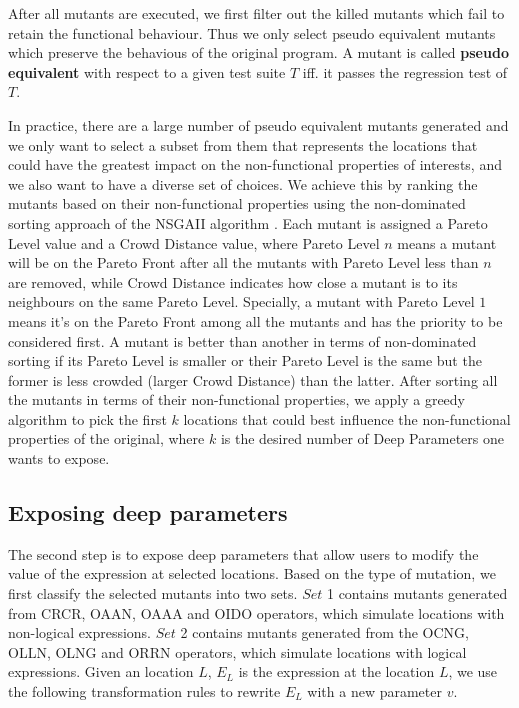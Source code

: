 After all mutants are executed, we first filter out the killed mutants which fail to retain the functional behaviour.  Thus we only select pseudo equivalent mutants which preserve the behavious of the original program. A mutant is called \textbf{pseudo equivalent} with respect to a given test suite $T$ iff. it passes the regression test of $T$.

In practice, there are a large number of pseudo equivalent mutants \cite{5477100} generated and we only want to select a subset from them that represents the locations that could have the greatest impact on the non-functional properties of interests, and we also want to have a diverse set of choices.  
We achieve this by ranking the mutants based on their non-functional properties using the non-dominated sorting approach of the NSGAII algorithm \cite{996017}. Each mutant is assigned a Pareto Level value and a Crowd Distance value, where Pareto Level $n$ means a mutant will be on the Pareto Front after all the mutants with Pareto Level less than $n$ are removed, while Crowd Distance indicates how close a mutant is to its neighbours on the same Pareto Level. Specially, a mutant with Pareto Level $1$ means it's on the Pareto Front among all the mutants and has the priority to be considered first. A mutant is better than another in terms of non-dominated sorting if its Pareto Level is smaller or their Pareto Level is the same but the former is less crowded (larger Crowd Distance) than the latter. After sorting all the mutants in terms of their non-functional properties, we apply a greedy algorithm to pick the first $k$ locations that could best influence the non-functional properties of the original, where $k$ is the desired number of Deep Parameters one wants to expose.

\subsection{Exposing deep parameters}
\label{exposing}
The second step is to expose deep parameters that allow users to modify the value of the expression at selected locations. Based on the type of mutation, we first classify the selected mutants into two sets. $Set$ 1 contains mutants generated from CRCR, OAAN, OAAA and OIDO operators, which simulate locations with non-logical expressions. $Set$ 2 contains mutants generated from the OCNG, OLLN, OLNG and ORRN operators, which simulate locations with logical expressions. 
Given an location $L$, $E_L$ is the expression at the location $L$, we use the following transformation rules to rewrite $E_L$ with a new parameter $v$.

